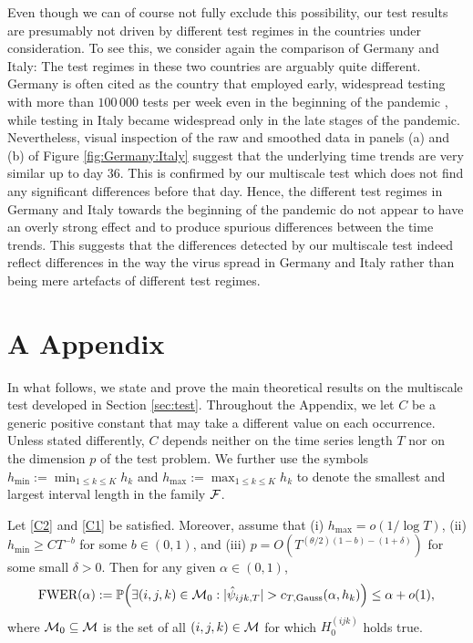 \documentclass[a4paper,12pt]{article}
\numberwithin{equation}{section}
\begin{document}
Even though we can of course not fully exclude this possibility, our test results are presumably not driven by different test regimes in the countries under consideration. To see this, we consider again the comparison of Germany and Italy: The test regimes in these two countries are arguably quite different. Germany is often cited as the country that employed early, widespread testing with more than $100\,000$ tests per week even in the beginning of the pandemic \citep{Cohen2020}, while testing in Italy became widespread only in the late stages of the pandemic. 
Nevertheless, visual inspection of the raw and smoothed data in panels (a) and (b) of Figure \ref{fig:Germany:Italy} suggest that the underlying time trends are very similar up to day $36$. This is confirmed by our multiscale test which does not find any significant differences before that day. Hence, the different test regimes in Germany and Italy towards the beginning of the pandemic do not appear to have an overly strong effect and to produce spurious differences between the time trends. This suggests that the differences detected by our multiscale test indeed reflect differences in the way the virus spread in Germany and Italy rather than being mere artefacts of different test regimes. 



\newpage
\section*{A \hspace{0.2cm} Appendix}
\def\theequation{A.\arabic{equation}}
\setcounter{equation}{0}

\enlargethispage{0.1cm}


In what follows, we state and prove the main theoretical results on the multiscale test developed in Section \ref{sec:test}. Throughout the Appendix, we let $C$ be a generic positive constant that may take a different value on each occurrence. Unless stated differently, $C$ depends neither on the time series length $T$ nor on the dimension $p$ of the test problem. We further use the symbols $h_{\min}:= \min_{1 \le k \le K} h_k$ and $h_{\max} := \max_{1 \le k \le K} h_k$ to denote the smallest and largest interval length in the family $\mathcal{F}$. 


\begin{theoremA}\label{theo1}
Let \ref{C2} and \ref{C1} be satisfied. Moreover, assume that (i) $h_{\max} = o(1/\log T)$, (ii) $h_{\min} \ge CT^{-b}$ for some $b \in (0,1)$, and (iii) $p = O(T^{(\theta/2)(1-b)-(1+\delta)})$ for some small $\delta > 0$. Then for any given $\alpha \in (0,1)$,
\[ \textnormal{FWER}(\alpha) := \mathbb{P} \Big( \exists (i,j,k) \in \mathcal{M}_0: |\hat{\psi}_{ijk,T}| > c_{T,\textnormal{Gauss}}(\alpha,h_k) \Big) \le \alpha + o(1), \]
where $\mathcal{M}_0 \subseteq \mathcal{M}$ is the set of all $(i,j,k) \in \mathcal{M}$ for which $H_0^{(ijk)}$ holds true. 
\end{theoremA}
\end{document}

